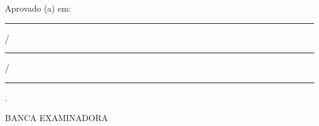 
\begin{folhadeaprovacao}

  \begin{center}
    \MakeTextUppercase{\imprimirautor}

    \vspace*{2\onelineskip}

    \MakeTextUppercase{\imprimirtitulo}
  \end{center}

  \vspace*{\onelineskip}

  \hfill
  \begin{minipage}{.5\textwidth}
    \imprimirpreambulo
  \end{minipage}

  \vspace*{2\onelineskip}

  \noindent Aprovado (a) em: \rule{1cm}{0.4pt} / \rule{1cm}{0.4pt} / \rule{1.5cm}{0.4pt}.

  \vspace*{2\onelineskip}

  \begin{center}
    BANCA EXAMINADORA
  \end{center}

  \assinatura{\boardmemberone \\ \boardmemberoneinstitution}
  \assinatura{\boardmembertwo \\ \boardmembertwoinstitution}
  \assinatura{\boardmemberthree \\ \boardmemberthreeinstitution}

\end{folhadeaprovacao}
